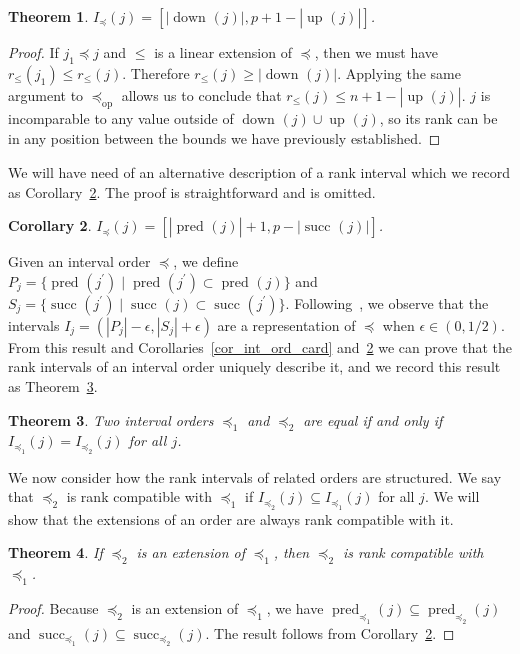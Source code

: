 \documentclass[12pt]{article}
\newcommand{\dual}[1]{#1_{\operatorname{op}}}
\newcommand{\dset}[2][]{\operatorname{down}_{#1}(#2)}
\newcommand{\uset}[2][]{\operatorname{up}_{#1}(#2)}
\newcommand{\pset}[2][]{\operatorname{pred}_{#1}(#2)}
\newcommand{\sset}[2][]{\operatorname{succ}_{#1}(#2)}
\newtheorem{theorem}{Theorem}
\numberwithin{theorem}{section}
\newtheorem{corollary}[theorem]{Corollary}
\begin{document}
\begin{theorem}
\label{thm_rank_int}
$I_\preceq(j) = [|\dset{j}|, p + 1 - |\uset{j}|]$.
\end{theorem}
\begin{proof}
If $j_1 \preceq j$ and $\leqslant$ is a linear extension of $\preceq$, then we must have $r_\leqslant(j_1) \leq r_\leqslant(j)$.  Therefore $r_\leqslant(j) \geq |\dset{j}|$.  Applying the same argument to $\dual{\preceq}$ allows us to conclude that $r_\leqslant(j) \leq n + 1 - |\uset{j}|$.  $j$ is incomparable to any value outside of $\dset{j} \cup \uset{j}$, so its rank can be in any position between the bounds we have previously established.
\end{proof}

We will have need of an alternative description of a rank interval which we record as Corollary~\ref{cor_rank_int_alt}.  The proof is straightforward and is omitted.

\begin{corollary}
\label{cor_rank_int_alt}
$I_\preceq(j) = [|\pset{j}| + 1, p - |\sset{j}|]$.
\end{corollary}

Given an interval order $\preceq$, we define $P_j = \{\pset{j^{'}} \mid \pset{j^{'}} \subset \pset{j}\}$ and $S_j = \{\sset{j^{'}} \mid \sset{j} \subset \sset{j^{'}}\}$.  Following~\cite{mitas1994semiRep}, we observe that the intervals $I_j = (|P_j| - \epsilon, |S_j| + \epsilon)$ are a representation of $\preceq$ when $\epsilon \in (0, 1/2)$.  From this result and Corollaries~\ref{cor_int_ord_card} and~\ref{cor_rank_int_alt} we can prove that the rank intervals of an interval order uniquely describe it, and we record this result as Theorem~\ref{thm_rank_int_equal}.

\begin{theorem}
\label{thm_rank_int_equal}
Two interval orders $\preceq_1$ and $\preceq_2$ are equal if and only if $I_{\preceq_1}(j) = I_{\preceq_2}(j)$ for all $j$.
\end{theorem}

We now consider how the rank intervals of related orders are structured.  We say that $\preceq_2$ is rank compatible with $\preceq_1$ if $I_{\preceq_2}(j) \subseteq I_{\preceq_1}(j)$ for all $j$.  We will show that the extensions of an order are always rank compatible with it.

\begin{theorem}
\label{thm_rank_compat}
If $\preceq_2$ is an extension of $\preceq_1$, then $\preceq_2$ is rank compatible with $\preceq_1$.
\end{theorem}
\begin{proof}
Because $\preceq_2$ is an extension of $\preceq_1$, we have $\pset[\preceq_1]{j} \subseteq \pset[\preceq_2]{j}$ and $\sset[\preceq_1]{j} \subseteq \sset[\preceq_2]{j}$.  The result follows from Corollary~\ref{cor_rank_int_alt}.
\end{proof}
\end{document}
